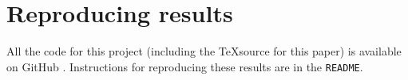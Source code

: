 \FloatBarrier

\appendix

\section{Reproducing results}

All the code for this project (including the \TeX source for this paper) is available on GitHub \cite{stat-comps-github}. Instructions for reproducing these results are in the \texttt{README}.

